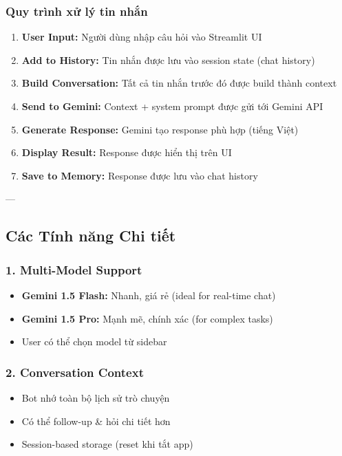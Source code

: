 \documentclass[12pt,a4paper]{article}
\begin{document}
\subsubsection{Quy trình xử lý tin nhắn}

\begin{enumerate}
    \item \textbf{User Input:} Người dùng nhập câu hỏi vào Streamlit UI
    \item \textbf{Add to History:} Tin nhắn được lưu vào session state (chat history)
    \item \textbf{Build Conversation:} Tất cả tin nhắn trước đó được build thành context
    \item \textbf{Send to Gemini:} Context + system prompt được gửi tới Gemini API
    \item \textbf{Generate Response:} Gemini tạo response phù hợp (tiếng Việt)
    \item \textbf{Display Result:} Response được hiển thị trên UI
    \item \textbf{Save to Memory:} Response được lưu vào chat history
\end{enumerate}

---

\subsection{Các Tính năng Chi tiết}

\subsubsection{1. Multi-Model Support}
\begin{itemize}
    \item \textbf{Gemini 1.5 Flash:} Nhanh, giá rẻ (ideal for real-time chat)
    \item \textbf{Gemini 1.5 Pro:} Mạnh mẽ, chính xác (for complex tasks)
    \item User có thể chọn model từ sidebar
\end{itemize}

\subsubsection{2. Conversation Context}
\begin{itemize}
    \item Bot nhớ toàn bộ lịch sử trò chuyện
    \item Có thể follow-up \& hỏi chi tiết hơn
    \item Session-based storage (reset khi tắt app)
\end{itemize}
\end{document}
